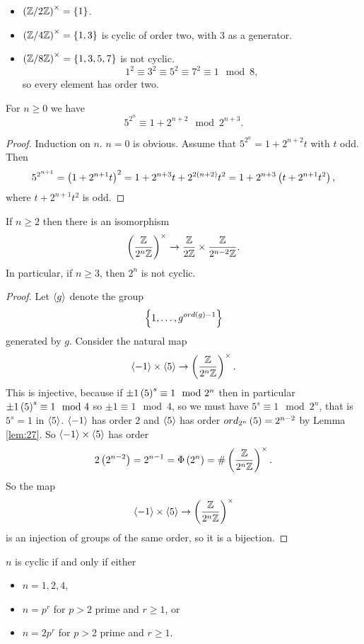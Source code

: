 \begin{example2}
\hfill
\begin{itemize}
\item $ \left( \mathbb{Z} / 2\mathbb{Z} \right)^\times = \left\{ 1 \right\} $.
\item $ \left( \mathbb{Z} / 4\mathbb{Z} \right)^\times = \left\{ 1, 3 \right\} $ is cyclic of order two, with $ 3 $ as a generator.
\item $ \left( \mathbb{Z} / 8\mathbb{Z} \right)^\times = \left\{ 1, 3, 5, 7 \right\} $ is not cyclic.
$$ 1^2 \equiv 3^2 \equiv 5^2 \equiv 7^2 \equiv 1 \mod 8, $$
so every element has order two.
\end{itemize}
\end{example2}

\begin{lemma}
\label{lem:27}
For $ n \ge 0 $ we have
$$ 5^{2^n} \equiv 1 + 2^{n + 2} \mod 2^{n + 3}. $$
\end{lemma}

\begin{proof}
Induction on $ n $. $ n = 0 $ is obvious. Assume that $ 5^{2^n} = 1 + 2^{n + 2}t $ with $ t $ odd. Then
$$ 5^{2^{n + 1}} = \left( 1 + 2^{n + 1}t \right)^2 = 1 + 2^{n + 3}t + 2^{2\left( n + 2 \right)}t^2 = 1 + 2^{n + 3}\left( t + 2^{n + 1}t^2 \right), $$
where $ t + 2^{n + 1}t^2 $ is odd.
\end{proof}

\begin{proposition}
If $ n \ge 2 $ then there is an isomorphism
$$ \left( \dfrac{\mathbb{Z}}{2^n\mathbb{Z}} \right)^\times \to \dfrac{\mathbb{Z}}{2\mathbb{Z}} \times \dfrac{\mathbb{Z}}{2^{n - 2}\mathbb{Z}}. $$
In particular, if $ n \ge 3 $, then $ \unit{2^n} $ is not cyclic.
\end{proposition}

\begin{proof}
Let $ \left\langle g \right\rangle $ denote the group
$$ \left\{ 1, \dots, g^{ord\left( g \right) - 1} \right\} $$
generated by $ g $. Consider the natural map
$$ \left\langle -1 \right\rangle \times \left\langle 5 \right\rangle \to \left( \dfrac{\mathbb{Z}}{2^n\mathbb{Z}} \right)^\times. $$
This is injective, because if $ \pm 1\left( 5 \right)^s \equiv 1 \mod 2^n $ then in particular $ \pm 1\left( 5 \right)^s \equiv 1 \mod 4 $ so $ \pm 1 \equiv 1 \mod 4 $, so we must have $ 5^s \equiv 1 \mod 2^n $, that is $ 5^s = 1 $ in $ \left\langle 5 \right\rangle $. $ \left\langle -1 \right\rangle $ has order $ 2 $ and $ \left\langle 5 \right\rangle $ has order $ ord_{2^n}\left( 5 \right) = 2^{n - 2} $ by Lemma \ref{lem:27}. So $ \left\langle -1 \right\rangle \times \left\langle 5 \right\rangle $ has order
$$ 2\left( 2^{n - 2} \right) = 2^{n - 1} = \Phi\left( 2^n \right) = \#\left( \dfrac{\mathbb{Z}}{2^n\mathbb{Z}} \right)^\times. $$
So the map
$$ \left\langle -1 \right\rangle \times \left\langle 5 \right\rangle \to \left( \dfrac{\mathbb{Z}}{2^n\mathbb{Z}} \right)^\times $$
is an injection of groups of the same order, so it is a bijection.
\end{proof}

\begin{theorem}
$ \unit{n} $ is cyclic if and only if either
\begin{itemize}
\item $ n = 1, 2, 4 $,
\item $ n = p^r $ for $ p > 2 $ prime and $ r \ge 1 $, or
\item $ n = 2p^r $ for $ p > 2 $ prime and $ r \ge 1 $.
\end{itemize}
\end{theorem}

